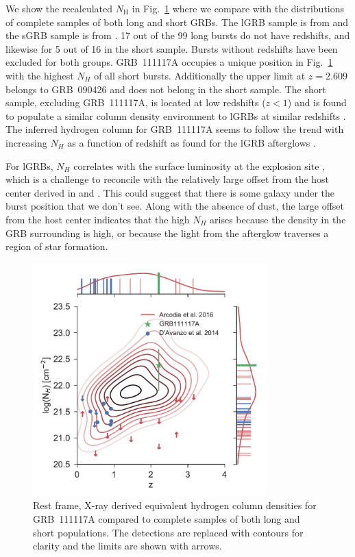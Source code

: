 \documentclass{aa}    %
\begin{document}
We show the recalculated $N_\mathrm{H}$ in Fig.~\ref{fig:NH_z} where we compare
with the distributions of complete samples of both long and short GRBs. The lGRB
sample is from \citet{Arcodia2016} and the sGRB sample is from
\citet{DAvanzo2014a}. 17 out of the 99 long bursts do not have redshifts, and
likewise for 5 out of 16 in the short sample. Bursts without redshifts have been
excluded for both groups. GRB~111117A occupies a unique position in
Fig.~\ref{fig:NH_z} with the highest $N_H$ of all short bursts. Additionally the
upper limit at $z = 2.609$ belongs to GRB~090426 and does not belong in the
short sample. The short sample, excluding GRB~111117A, is located at low
redshifts ($z < 1$) and is found to populate a similar column density
environment to lGRBs at similar redshifts \citep{DAvanzo2014a}. The inferred
hydrogen column for GRB~111117A seems to follow the trend with increasing $N_H$
as a function of redshift as found for the lGRB afterglows \citep{Arcodia2016}. 

For lGRBs, $N_H$ correlates with the surface luminosity at the explosion site
\citep{Lyman2017}, which is a challenge to reconcile  with the relatively large
offset from the host center derived in \citet{Margutti2012} and
\citet{Sakamoto2013}. This could suggest that there is some galaxy under the
burst position that we don’t see. Along with the absence of dust, the large
offset from the host center indicates that the high $N_H$ arises because the
density in the GRB surrounding is high, or because the light from the afterglow
traverses a region of star formation.

\begin{figure}
	\centering
	\includegraphics[width=9cm]{figures/NH_z.pdf}
	\caption{Rest frame, X-ray derived equivalent hydrogen column densities for GRB~111117A compared to complete samples of both long and short populations. The detections are replaced with contours for clarity and the limits are shown with arrows.}
	\label{fig:NH_z}
\end{figure}
\end{document}

